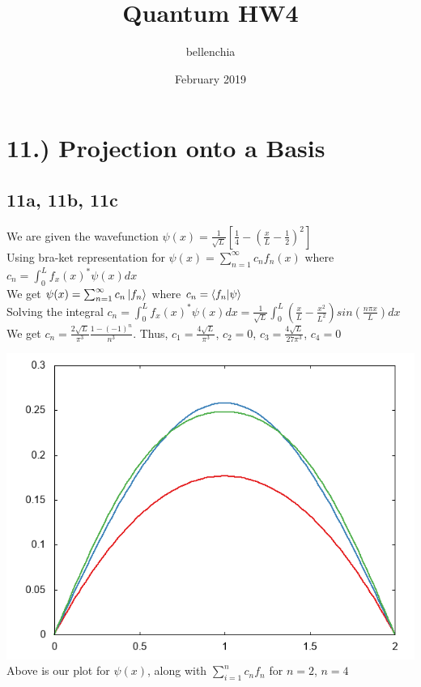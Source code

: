 \documentclass[10pt]{article}
\title{Quantum HW4}
\author{bellenchia}
\date{February 2019}
\begin{document}
\maketitle




\section*{11.) Projection onto a Basis}
\subsection*{11a, 11b, 11c}
We are given the wavefunction $\psi(x)=\frac{1}{\sqrt{L}}[\frac{1}{4}-(\frac{x}{L}-\frac{1}{2})^2]$\\

Using bra-ket representation for $\psi(x)=\sum_{n=1}^\infty c_nf_n(x)$ where $c_n={\displaystyle\int_0^L}f_x(x)^*\psi(x)dx$\\
We get $\psi(x)=\sum_{n=1}^\infty c_n\ket{f_n}$ where  $c_n=\braket{f_n|\psi}$\\

Solving the integral $c_n={\displaystyle\int_0^L}f_x(x)^*\psi(x)dx=\frac{1}{\sqrt{L}}{\displaystyle\int_0^L}(\frac{x}{L}-\frac{x^2}{L^2})sin(\frac{n\pi x}{L})dx$\\

We get $c_n=\frac{2\sqrt{L}}{\pi^3}\frac{1-(-1)^n}{n^3}$. Thus, $c_1=\frac{4\sqrt{L}}{\pi^3}$, $c_2=0$, $c_3=\frac{4\sqrt{L}}{27\pi^3}$, $c_4=0$\\
\begin{center}
    \includegraphics[width=0.6\linewidth]{q11_7.png}\\
Above is our plot for $\psi(x)$, along with $\sum_{i=1}^{n}c_nf_n$ for $n=2$, $n=4$\\
\end{center}
\end{document}
